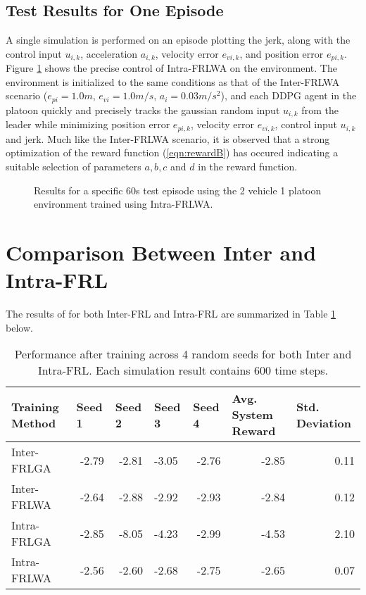 \subsection{Test Results for One Episode}
A single simulation is performed on an episode plotting the jerk, along with the control
input $u_{i,k}$, acceleration $a_{i,k}$, velocity error $e_{vi,k}$, and position
error $e_{pi,k}$.  Figure \ref{fig:intraFRL-simresult} shows the precise control of
Intra-FRLWA on the environment.  The environment is initialized to the same conditions
as that of the Inter-FRLWA scenario
($e_{pi} = 1.0 m$, $e_{vi}=1.0 m/s$, $a_i = 0.03 m/s^2$), and each DDPG agent in the
platoon quickly and precisely tracks the gaussian random input $u_{i,k}$ from the
leader while minimizing position error $e_{pi,k}$, velocity error $e_{vi,k}$, control input $u_{i,k}$ and jerk.  Much
like the Inter-FRLWA scenario, it is observed that a strong optimization of the reward
function (\ref{eqn:rewardB}) has occured indicating a suitable selection of parameters $a,b,c$ and $d$ in the
reward function.

\begin{figure}[H]
    \centering
    
    \caption{Results for a specific 60s test episode using the 2 vehicle 1 platoon
    environment trained using Intra-FRLWA.}
    \label{fig:intraFRL-simresult}
\end{figure}

\section{Comparison Between Inter and Intra-FRL}
The results of for both Inter-FRL and Intra-FRL are summarized in Table \ref{tab:inter_vs_intra} below.

\begin{table}[H]
    \centering
    \scriptsize
    \caption{Performance after training across 4 random seeds for both Inter and Intra-FRL. Each simulation result contains 600 time steps.}
    \begin{tabular}{lrrlrrr} \toprule
    \textbf{Training Method} & \multicolumn{1}{l}{\textbf{Seed 1}} & \multicolumn{1}{l}{\textbf{Seed 2}} & \multicolumn{1}{l}{\textbf{Seed 3}} & \multicolumn{1}{l}{\textbf{Seed 4}} & \multicolumn{1}{l}{\textbf{Avg. System Reward}} & \multicolumn{1}{l}{\textbf{Std. Deviation}} \\ \midrule
        Inter-FRLGA & -2.79 & -2.81 & -3.05 & -2.76 & -2.85 & 0.11 \\
        Inter-FRLWA & -2.64 & -2.88 & -2.92 & -2.93 & -2.84 & 0.12 \\
        Intra-FRLGA & -2.85 & -8.05 & -4.23 & -2.99 & -4.53 & 2.10 \\
        Intra-FRLWA & -2.56 & -2.60 & -2.68 & -2.75 & -2.65 & 0.07 \\ \bottomrule
    \end{tabular}
    \label{tab:inter_vs_intra}
\end{table}

